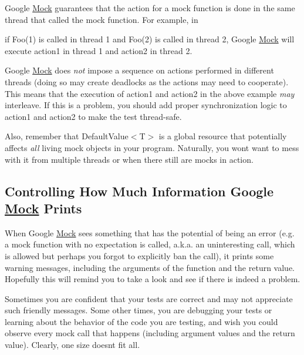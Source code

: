 Google \mbox{\hyperlink{class_mock}{Mock}} guarantees that the action for a mock function is done in the same thread that called the mock function. For example, in


\begin{DoxyCode}{0}
\end{DoxyCode}


if {\ttfamily Foo(1)} is called in thread 1 and {\ttfamily Foo(2)} is called in thread 2, Google \mbox{\hyperlink{class_mock}{Mock}} will execute {\ttfamily action1} in thread 1 and {\ttfamily action2} in thread 2.

Google \mbox{\hyperlink{class_mock}{Mock}} does {\itshape not} impose a sequence on actions performed in different threads (doing so may create deadlocks as the actions may need to cooperate). This means that the execution of {\ttfamily action1} and {\ttfamily action2} in the above example {\itshape may} interleave. If this is a problem, you should add proper synchronization logic to {\ttfamily action1} and {\ttfamily action2} to make the test thread-\/safe.

Also, remember that {\ttfamily Default\+Value$<$T$>$} is a global resource that potentially affects {\itshape all} living mock objects in your program. Naturally, you won\textquotesingle{}t want to mess with it from multiple threads or when there still are mocks in action.

\subsection*{Controlling How Much Information Google \mbox{\hyperlink{class_mock}{Mock}} Prints}

When Google \mbox{\hyperlink{class_mock}{Mock}} sees something that has the potential of being an error (e.\+g. a mock function with no expectation is called, a.\+k.\+a. an uninteresting call, which is allowed but perhaps you forgot to explicitly ban the call), it prints some warning messages, including the arguments of the function and the return value. Hopefully this will remind you to take a look and see if there is indeed a problem.

Sometimes you are confident that your tests are correct and may not appreciate such friendly messages. Some other times, you are debugging your tests or learning about the behavior of the code you are testing, and wish you could observe every mock call that happens (including argument values and the return value). Clearly, one size doesn\textquotesingle{}t fit all.


